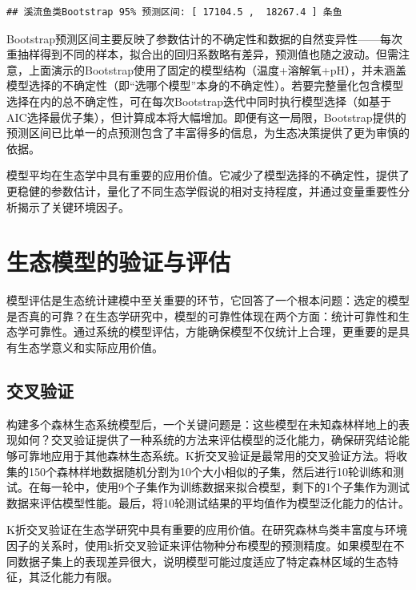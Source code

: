 \documentclass[
  twoside,12pt,fontset=none]{ctexbook}
\begin{document}
\begin{verbatim}
## 溪流鱼类Bootstrap 95% 预测区间: [ 17104.5 ,  18267.4 ] 条鱼
\end{verbatim}

Bootstrap预测区间主要反映了参数估计的不确定性和数据的自然变异性------每次重抽样得到不同的样本，拟合出的回归系数略有差异，预测值也随之波动。但需注意，上面演示的Bootstrap使用了固定的模型结构（温度+溶解氧+pH），并未涵盖模型选择的不确定性（即``选哪个模型''本身的不确定性）。若要完整量化包含模型选择在内的总不确定性，可在每次Bootstrap迭代中同时执行模型选择（如基于AIC选择最优子集），但计算成本将大幅增加。即便有这一局限，Bootstrap提供的预测区间已比单一的点预测包含了丰富得多的信息，为生态决策提供了更为审慎的依据。

模型平均在生态学中具有重要的应用价值。它减少了模型选择的不确定性，提供了更稳健的参数估计，量化了不同生态学假说的相对支持程度，并通过变量重要性分析揭示了关键环境因子。

\hypertarget{ux751fux6001ux6a21ux578bux7684ux9a8cux8bc1ux4e0eux8bc4ux4f30}{%
\section{生态模型的验证与评估}\label{ux751fux6001ux6a21ux578bux7684ux9a8cux8bc1ux4e0eux8bc4ux4f30}}

模型评估是生态统计建模中至关重要的环节，它回答了一个根本问题：选定的模型是否真的可靠？在生态学研究中，模型的可靠性体现在两个方面：统计可靠性和生态学可靠性。通过系统的模型评估，方能确保模型不仅统计上合理，更重要的是具有生态学意义和实际应用价值。

\hypertarget{ux4ea4ux53c9ux9a8cux8bc1}{%
\subsection{交叉验证}\label{ux4ea4ux53c9ux9a8cux8bc1}}

构建多个森林生态系统模型后，一个关键问题是：这些模型在未知森林样地上的表现如何？交叉验证提供了一种系统的方法来评估模型的泛化能力，确保研究结论能够可靠地应用于其他森林生态系统。K折交叉验证是最常用的交叉验证方法。将收集的150个森林样地数据随机分割为10个大小相似的子集，然后进行10轮训练和测试。在每一轮中，使用9个子集作为训练数据来拟合模型，剩下的1个子集作为测试数据来评估模型性能。最后，将10轮测试结果的平均值作为模型泛化能力的估计。

K折交叉验证在生态学研究中具有重要的应用价值。在研究森林鸟类丰富度与环境因子的关系时，使用k折交叉验证来评估物种分布模型的预测精度。如果模型在不同数据子集上的表现差异很大，说明模型可能过度适应了特定森林区域的生态特征，其泛化能力有限。
\end{document}
